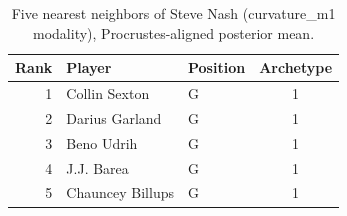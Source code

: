 \begin{table}[htbp]
  \centering\small
  \begin{tabular}{rllc}
    \toprule
    Rank & Player & Position & Archetype \\
    \midrule
    1 & Collin Sexton & G & 1 \\
    2 & Darius Garland & G & 1 \\
    3 & Beno Udrih & G & 1 \\
    4 & J.J. Barea & G & 1 \\
    5 & Chauncey Billups & G & 1 \\
    \bottomrule
  \end{tabular}
  \caption{Five nearest neighbors of Steve Nash (curvature_m1 modality), Procrustes-aligned posterior mean.}
  \label{tab:Steve_Nash_neighbors_curvature_m1}
\end{table}

